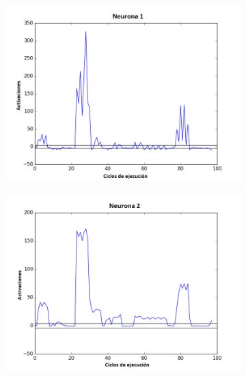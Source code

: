 \begin{figure}[!h]
    \centering %
\begin{subfigure}{0.33\textwidth}
  \includegraphics[width=\linewidth]{Imagenes/Agente1Activaciones/Agente3/Neurona0}
\end{subfigure}\hfil %
\begin{subfigure}{0.33\textwidth}
  \includegraphics[width=\linewidth]{Imagenes/Agente1Activaciones/Agente3/Neurona1}
\end{subfigure}\hfil %
\begin{subfigure}{0.33\textwidth}

\end{subfigure}
\end{figure}
